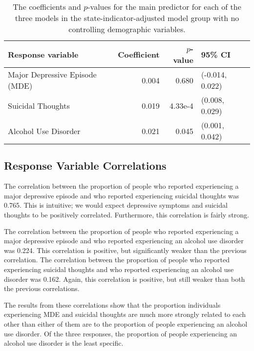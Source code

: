 \documentclass{article}
\begin{document}
\begin{table}[!htb]
\begin{tabular}{l r r l}
    \hline
    Response variable & Coefficient & $p$-value & 95\% CI\\
    \hline
    Major Depressive Episode (MDE) & 0.004 & 0.680 & (-0.014, 0.022)\\
    Suicidal Thoughts & 0.019 & 4.33e-4 & (0.008, 0.029)\\
    Alcohol Use Disorder & 0.021 & 0.045 & (0.001, 0.042)\\
    \hline
\end{tabular}

\begin{center}
\caption{\label{tab:state-ind-only-model-results} The coefficients and $p$-values
    for the main predictor for each of the three models
    in the state-indicator-adjusted model group with no controlling demographic variables.
}
\end{center}
\end{table}

\subsection{Response Variable Correlations}

The correlation between the proportion of people who reported experiencing
a major depressive episode and
who reported experiencing suicidal thoughts was
0.765.
This is intuitive; we would expect depressive symptoms and suicidal thoughts
to be positively correlated.
Furthermore, this correlation is fairly strong.

The correlation between the proportion of people who reported experiencing
a major depressive episode and
who reported experiencing an alcohol use disorder was
0.224.
This correlation is positive, but significantly weaker than
the previous correlation.
The correlation between the proportion of people who reported experiencing
suicidal thoughts and
who reported experiencing an alcohol use disorder was
0.162.
Again, this correlation is positive, but still weaker than
both the previous correlations.

The results from these correlations show that the proportion individuals
experiencing MDE and suicidal thoughts are much more strongly related to each
other than either of them are to the proportion of people experiencing
an alcohol use disorder.
Of the three responses, the proportion of people experiencing an
alcohol use disorder is the least specific.
\end{document}
